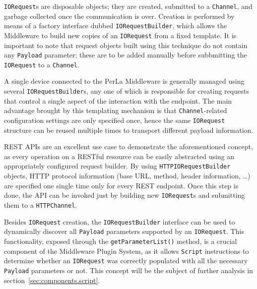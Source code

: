 \texttt{IORequest}s are disposable objects; they are created, submitted to a \texttt{Channel}, and garbage collected once the communication is over. Creation is performed by means of a factory interface dubbed \texttt{IORequestBuilder}, which allows the Middleware to build new copies of an \texttt{IORequest} from a fixed template. It is important to note that request objects built using this technique do not contain any \texttt{Payload} parameter; these are to be added manually before subbmitting the \texttt{IORequest} to a \texttt{Channel}.

A single device connected to the PerLa Middleware is generally managed using several \texttt{IORequestBuilder}s, any one of which is responsible for creating requests that control a single aspect of the interaction with the endpoint. The main advantage brought by this templating mechanism is that \texttt{Channel}-related configuration settings are only specified once, hence the same \texttt{IORequest} structure can be reused multiple times to transport different payload information.

REST APIs are an excellent use case to demonstrate the aforementioned concept, as every operation on a RESTful resource can be easily abstracted using an appropriately configured request builder. By using \texttt{HTTPIORequestBuilder} objects, HTTP protocol information (base URL, method, header information, \ldots) are specified one single time only for every REST endpoint. Once this step is done, the API can be invoked just by building new \texttt{IORequest}s and submitting them to a \texttt{HTTPChannel}.

Besides \texttt{IORequest} creation, the \texttt{IORequestBuilder} interface can be used to dynamically discover all \texttt{Payload} parameters supported by an \texttt{IORequest}. This functionality, exposed through the \texttt{getParameterList()} method, is a crucial component of the Middleware Plugin System, as it allows \texttt{Script} instructions to determine whether an \texttt{IORequest} was correctly populated with all the necessary \texttt{Payload} parameters or not. This concept will be the subject of further analysis in section~\ref{sec:components.script}.


